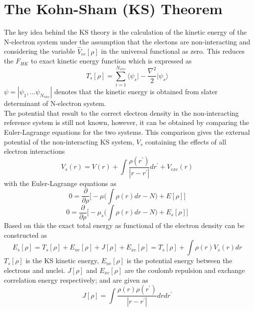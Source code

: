 \documentclass[a4paper,11pt]{report}
\begin{document}
\section{The Kohn-Sham (KS) Theorem}
The key idea behind the KS theory is the calculation of the kinetic energy of the N-electron system under the assumption that the electons are 
non-interacting \citep{kohn1965self} and considering the variable $\hat{V}_{ee}[\rho]$ in the universal functional as zero. This reduces the
$F_{HK}$ to exact kinetic energy function which is expressed as
\begin{equation}\label{ks}
T_{s}[\rho] = \sum_{i=1}^{N_{elec}}\big \langle\psi_{s}\bigg|-\frac{\nabla^{2}}{2}\bigg|\psi_{s}\big \rangle
\end{equation}
$\psi=|\psi_{1},...\psi_{N_{elec}}|$ denotes that the kinetic energy is obtained from slater determinant of N-electron system.\\
The potential that result to the correct electron density in the non-interacting reference system is still not known, however, it can be 
obtained by comparing the Euler-Lagrange equations for the two systems.  
This comparison gives the 
external potential of the non-interacting KS system, $V_{s}$ containing the effects of all electron interactions
\begin{equation}\label{vss}
V_{s}(r) = V(r) + \int\frac{\rho(r^{'})}{|r-r^{'}|}dr^{'} + V_{exc}(r)
\end{equation}
with the Euler-Lagrange equations as
\begin{equation}\label{elg1}
0 = \frac{\partial}{\partial\rho}\bigg[-\mu\bigg(\int\rho(r)dr-N\bigg) + E[\rho]\bigg] 
\end{equation}
\begin{equation}\label{elg2}
 0 = \frac{\partial}{\partial\rho}\bigg[-\mu_{s}\bigg(\int\rho(r)dr-N\bigg) + E_{s}[\rho]\bigg]
\end{equation}
Based on this the exact total energy as functional of the electron density can be constructed as
\begin{equation}\label{tenergy}
E_{s}[\rho] = T_{s}[\rho] + E_{ne}[\rho] + J[\rho] + E_{xc}[\rho] = T_{s}[\rho] + \int \rho(r)V_{s}(r)dr
\end{equation}
$T_{s}[\rho]$ is the KS kinetic energy, $E_{ne}[\rho]$ is the potential energy between the electrons and nuclei. $J[\rho]$ and $E_{xc}[\rho]$ 
are the coulomb repulsion and exchange correlation energy respectively; and are given as
\begin{equation}\label{jc}
J[\rho] = \int\frac{\rho(r)\rho(r^{'})}{|r-r^{'}|}drdr^{'} 
\end{equation}
\end{document}
